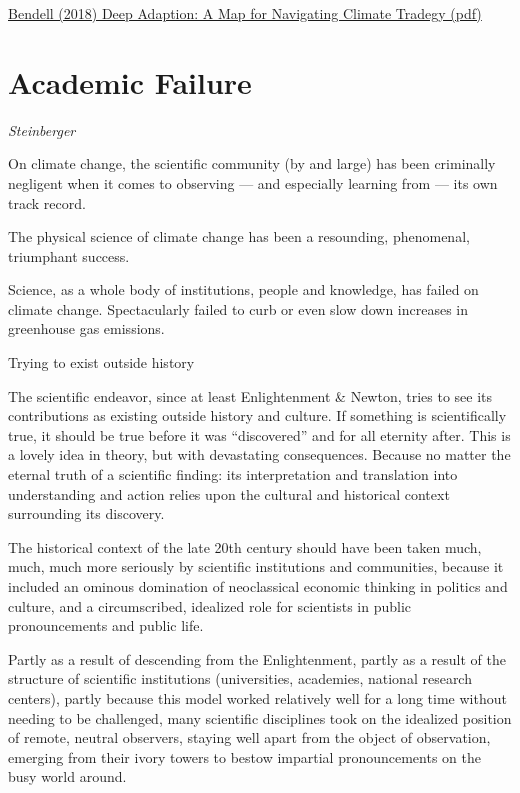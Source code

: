 \documentclass[
]{book}
\begin{document}
\href{pdf/Bendell_2020_Deep_Adaptation.pdf}{Bendell (2018) Deep Adaption: A Map for Navigating Climate Tradegy (pdf)}

\hypertarget{academic-failure}{%
\chapter{Academic Failure}\label{academic-failure}}

\emph{Steinberger}

On climate change, the scientific community (by and large) has been criminally negligent when it comes to observing --- and especially learning from --- its own track record.

The physical science of climate change has been a resounding, phenomenal, triumphant success.

Science, as a whole body of institutions, people and knowledge, has failed on climate change.
Spectacularly failed to curb or even slow down increases in greenhouse gas emissions.

Trying to exist outside history

The scientific endeavor, since at least Enlightenment \& Newton, tries to see its contributions as existing outside history and culture. If something is scientifically true, it should be true before it was ``discovered'' and for all eternity after. This is a lovely idea in theory, but with devastating consequences. Because no matter the eternal truth of a scientific finding: its interpretation and translation into understanding and action relies upon the cultural and historical context surrounding its discovery.

The historical context of the late 20th century should have been taken much, much, much more seriously by scientific institutions and communities, because it included an ominous domination of neoclassical economic thinking in politics and culture, and a circumscribed, idealized role for scientists in public pronouncements and public life.

Partly as a result of descending from the Enlightenment, partly as a result of the structure of scientific institutions (universities, academies, national research centers), partly because this model worked relatively well for a long time without needing to be challenged, many scientific disciplines took on the idealized position of remote, neutral observers, staying well apart from the object of observation, emerging from their ivory towers to bestow impartial pronouncements on the busy world around.
\end{document}
